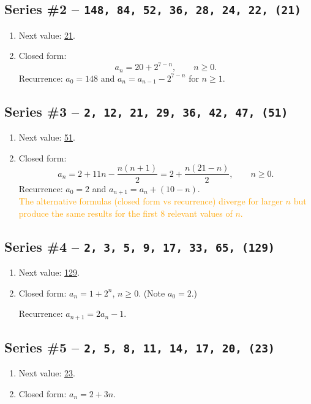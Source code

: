 \documentclass{sn-jnl}
\theoremstyle{definition}
\newcommand{\seq}[1]{\texttt{#1}}
\newcommand{\nextval}[1]{\underline{#1}}
\begin{document}
{%
\subsection*{Series \#2 -- \seq{148,\,84,\,52,\,36,\,28,\,24,\,22,\,(21)}}
\begin{enumerate}[label=(\alph*)]
  \item Next value: \nextval{21}.
  \item Closed form: 
  \[a_n = 20 + 2^{7-n},\qquad n\ge0.\]
  Recurrence: $a_0=148$ and $a_n=a_{n-1}-2^{7-n}$ for $n\ge1$.
\end{enumerate}

\subsection*{Series \#3 -- \seq{2,\,12,\,21,\,29,\,36,\,42,\,47,\,(51)}}
\begin{enumerate}[label=(\alph*)]
  \item Next value: \nextval{51}.
  \item Closed form:
  \[
    a_n = 2 + 11n - \frac{n(n+1)}{2}=2+\frac{n(21-n)}{2},\qquad n\ge0.
  \]
  Recurrence: $a_0=2$ and $a_{n+1}=a_n+(10-n)$.\\[1em]
  \textcolor{orange}{The alternative formulas (closed form vs recurrence) diverge for larger $n$ but produce the same results for the first 8 relevant values of $n$.} 
\end{enumerate}

\subsection*{Series \#4 -- \seq{2,\,3,\,5,\,9,\,17,\,33,\,65,\,(129)}}
\begin{enumerate}[label=(\alph*)]
  \item Next value: \nextval{129}.
  \item Closed form: $a_n=1+2^{n}$, $n\ge0$.  (Note $a_0=2$.)
  
  Recurrence: $a_{n+1}=2a_n-1$.
\end{enumerate}

\subsection*{Series \#5 -- \seq{2,\,5,\,8,\,11,\,14,\,17,\,20,\,(23)}}
\begin{enumerate}[label=(\alph*)]
  \item Next value: \nextval{23}.
  \item Closed form: $a_n = 2+3n$.
  

\end{enumerate}}
\end{document}
